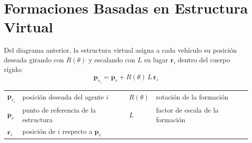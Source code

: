 \section{Formaciones Basadas en Estructura Virtual}

Del diagrama anterior, la estructura virtual asigna a cada vehículo su posición deseada girando con $R(\theta)$ y escalando con $L$ su lugar $\mathbf{r}_i$ dentro del cuerpo rígido:
\begin{equation*}
    \mathbf{p}_{r_i} = \mathbf{p}_r + R(\theta)\,L\,\mathbf{r}_i
\end{equation*}

{\footnotesize
\noindent
\begin{tabular}{l@{\ }l@{\qquad}l@{\ }l}
$\mathbf{p}_{r_i}$ & posición deseada del agente $i$ & $R(\theta)$ & rotación de la formación \\
$\mathbf{p}_r$ & punto de referencia de la estructura & $L$ & factor de escala de la formación \\
$\mathbf{r}_i$ & posición de $i$ respecto a $\mathbf{p}_r$ & & \\
\end{tabular}
}
